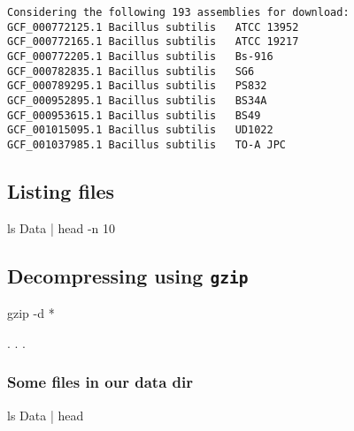 \documentclass[
  letterpaper,
  DIV=11,
  numbers=noendperiod]{scrreprt}
\newenvironment{Shaded}{\begin{snugshade}}{\end{snugshade}}
\newcommand{\AttributeTok}[1]{\textcolor[rgb]{0.40,0.46,0.14}{#1}}
\newcommand{\FunctionTok}[1]{\textcolor[rgb]{0.28,0.35,0.67}{#1}}
\newcommand{\KeywordTok}[1]{\textcolor[rgb]{0.00,0.46,0.62}{#1}}
\newcommand{\NormalTok}[1]{\textcolor[rgb]{0.00,0.46,0.62}{#1}}
\newcommand{\PreprocessorTok}[1]{\textcolor[rgb]{0.68,0.00,0.00}{#1}}
\begin{document}
\begin{verbatim}
Considering the following 193 assemblies for download:
GCF_000772125.1 Bacillus subtilis   ATCC 13952
GCF_000772165.1 Bacillus subtilis   ATCC 19217
GCF_000772205.1 Bacillus subtilis   Bs-916
GCF_000782835.1 Bacillus subtilis   SG6
GCF_000789295.1 Bacillus subtilis   PS832
GCF_000952895.1 Bacillus subtilis   BS34A
GCF_000953615.1 Bacillus subtilis   BS49
GCF_001015095.1 Bacillus subtilis   UD1022
GCF_001037985.1 Bacillus subtilis   TO-A JPC
\end{verbatim}

\hypertarget{listing-files}{%
\subsection*{Listing files}\label{listing-files}}

\begin{Shaded}
\begin{Highlighting}[]
\FunctionTok{ls}\NormalTok{ Data }\KeywordTok{|} \FunctionTok{head} \AttributeTok{{-}n}\NormalTok{ 10}
\end{Highlighting}
\end{Shaded}

\hypertarget{decompressing-using-gzip}{%
\subsection*{\texorpdfstring{Decompressing using
\texttt{gzip}}{Decompressing using gzip}}\label{decompressing-using-gzip}}

\begin{Shaded}
\begin{Highlighting}[]
\FunctionTok{gzip} \AttributeTok{{-}d} \PreprocessorTok{*}
\end{Highlighting}
\end{Shaded}

. . .

\hypertarget{some-files-in-our-data-dir}{%
\subsubsection*{Some files in our data
dir}\label{some-files-in-our-data-dir}}

\begin{Shaded}
\begin{Highlighting}[]
\FunctionTok{ls}\NormalTok{ Data }\KeywordTok{|} \FunctionTok{head}
\end{Highlighting}
\end{Shaded}
\end{document}

